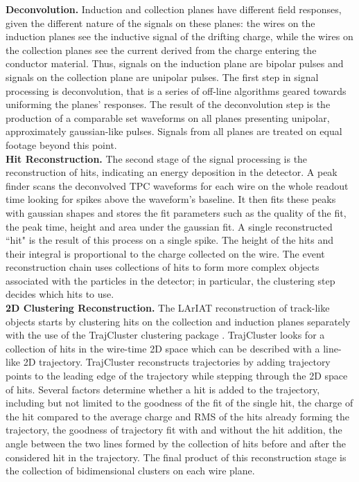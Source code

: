 \documentclass[aps,prl,twocolumn,showpacs,superscriptaddress,groupedaddress]{revtex4}  %
\begin{document}
\textbf{Deconvolution.} Induction and collection planes have different field responses, given the different nature of the signals on these planes: the wires on the induction planes see the inductive signal of the drifting charge, while the wires on the collection planes see the current derived from the charge entering the conductor material. Thus, signals on the induction plane are bipolar pulses and signals on the collection plane are unipolar pulses. %
The first step in signal processing is deconvolution, that is a series of off-line algorithms geared towards uniforming the planes'  responses. The result of the deconvolution step is  the production of  a comparable set waveforms on all planes presenting unipolar, approximately gaussian-like pulses. %
Signals from all planes are treated on equal footage beyond this point.\\


\textbf{Hit Reconstruction.} The second stage of the signal processing is the reconstruction of hits, indicating an energy deposition in the detector.  A peak finder scans the deconvolved TPC waveforms for each wire on the whole readout time looking for spikes  above  the waveform's baseline. It then fits these peaks with gaussian shapes and stores the fit parameters such as the quality of the fit, the peak time, height and area under the gaussian fit. A single reconstructed ``hit" is the result of this process on a single spike. The height of the hits and their integral is proportional to the charge collected on the wire.  The event reconstruction chain uses collections of hits to form more complex objects associated with the particles in the detector; in particular, the clustering step decides which hits to use. \\


\textbf{2D Clustering Reconstruction.} 
The LArIAT reconstruction of track-like objects starts by clustering hits on the collection and induction planes separately with the use of the TrajCluster clustering package \cite{Baller2016}. 
TrajCluster looks for a collection of hits in the wire-time 2D space which can be described with a line-like 2D trajectory. TrajCluster reconstructs trajectories by adding trajectory points to the leading edge of the trajectory while stepping through the 2D space of hits. Several factors determine whether a hit is added to the trajectory, including but not limited to the goodness of the fit of the single hit, the charge of the hit compared to the average charge and RMS of the hits already forming the trajectory, the goodness of trajectory fit with and without the hit addition, the angle between the two lines formed by the collection of hits before and after the considered hit in the trajectory.
The final product of this reconstruction stage is the collection of bidimensional clusters on each wire plane.\\%
\end{document}
